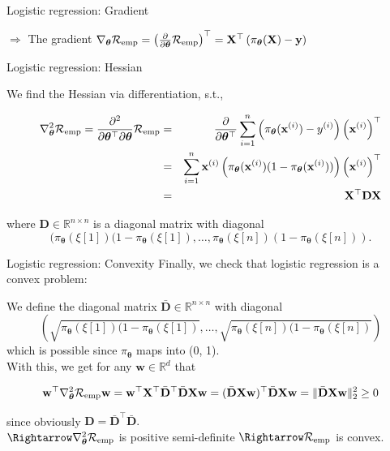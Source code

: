 \documentclass[11pt,compress,t,notes=noshow, xcolor=table]{beamer}
\begin{document}
\begin{vbframe}{Logistic regression: Gradient}
\vspace*{1cm}

$\Rightarrow$ The gradient $\nabla_{\bm{\theta}}\mathcal{R}_{\text{emp}} = \left(\frac{\partial}{\partial\bm{\theta}}\mathcal{R}_{\text{emp}}\right)^\top =  \mathbf{X}^\top\left(\pi_{\bm{\theta}}(\mathbf{X}) - \mathbf{y}\right)$ 

\end{vbframe}


\begin{vbframe}{Logistic regression: Hessian}

We find the Hessian via differentiation, s.t.,

\begin{align*}
  \nabla^2_{\bm{\theta}}\mathcal{R}_{\text{emp}}  = \frac{\partial^2}{\partial{\bm{\theta}^\top}\partial\bm{\theta}}\mathcal{R}_{\text{emp}}  & = & 
 \frac{\partial}{\partial{\bm{\theta}^\top}} \sum^n_{i=1} \left(\pi_{\bm{\theta}}(\mathbf{x}^{(i)}) - y^{(i)}\right)\left(\mathbf{x}^{(i)}\right)^\top\\
 & = & 
  \sum^n_{i=1}\mathbf{x}^{(i)} \left(\pi_{\bm{\theta}}(\mathbf{x}^{(i)})(1-\pi_{\bm{\theta}}(\mathbf{x}^{(i)}))\right)\left(\mathbf{x}^{(i)}\right)^\top\\
  & = & 
\mathbf{X}^\top \mathbf{D} \mathbf{X}\\
\end{align*}

where $\mathbf{D} \in \mathbb{R}^{n\times n}$ is a diagonal matrix with diagonal 
$$(\pi_{\bm{\theta}}(\xi[1])(1-\pi_{\bm{\theta}}(\xi[1]), \dots, \pi_{\bm{\theta}}(\xi[n])(1-\pi_{\bm{\theta}}(\xi[n])).$$

\end{vbframe}

\begin{vbframe}{Logistic regression: Convexity}
Finally, we check that logistic regression is a convex problem:
\vspace*{0.3cm}

We define the diagonal matrix $\bar{\mathbf{D}} \in \mathbb{R}^{n \times n}$ with diagonal 
$$\left(\sqrt{\pi_{\bm{\theta}}(\xi[1])(1-\pi_{\bm{\theta}}(\xi[1])}, \dots, \sqrt{\pi_{\bm{\theta}}(\xi[n])(1-\pi_{\bm{\theta}}(\xi[n])}\right) $$
which is possible since $\pi_{\bm{\theta}}$ maps into (0, 1). \\
\vspace*{0.3cm}
With this, we get for any $\mathbf{w} \in \mathbb{R}^d$ that

$$\mathbf{w}^\top  \nabla^2_{\bm{\theta}}\mathcal{R}_{\text{emp}} \mathbf{w} =   \mathbf{w}^\top  \mathbf{X}^\top \bar{\mathbf{D}}^\top \bar{\mathbf{D}}\mathbf{X} \mathbf{w} = (\bar{\mathbf{D}}\mathbf{X} \mathbf{w})^\top\bar{\mathbf{D}}\mathbf{X} \mathbf{w} = \Vert \bar{\mathbf{D}}\mathbf{X} \mathbf{w} \Vert^2_2 \geq 0$$

since obviously $\mathbf{D} = \bar{\mathbf{D}}^\top \bar{\mathbf{D}}.$ \\
\vspace*{0.3cm}
$\Rightarrow \nabla^2_{\bm{\theta}}\riske$ is positive semi-definite $\Rightarrow \riske$ is convex.

\end{vbframe}

\endlecture
\end{document}

